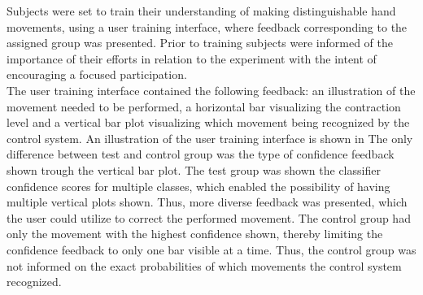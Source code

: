 

Subjects were set to train their understanding of making distinguishable hand movements, using a user training interface, where feedback corresponding to the assigned group was presented. Prior to training subjects were informed of the importance of their efforts in relation to the experiment with the intent of encouraging a focused participation. \\
The user training interface contained the following feedback: an illustration of the movement needed to be performed, a horizontal bar visualizing the contraction level and a vertical bar plot visualizing which movement being recognized by the control system. An illustration of the user training interface is shown in  The only difference between test and control group was the type of confidence feedback shown trough the vertical bar plot. The test group was shown the classifier confidence scores for multiple classes, which enabled the possibility of having multiple vertical plots shown. Thus, more diverse feedback was presented, which the user could utilize to correct the performed movement. The control group had only the movement with the highest confidence shown, thereby limiting the confidence feedback to only one bar visible at a time. Thus, the control group was not informed on the exact probabilities of which movements the control system recognized.      

